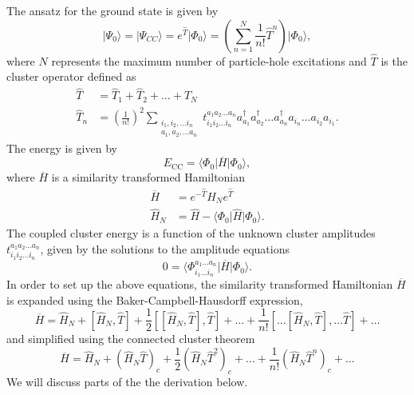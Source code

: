 \documentclass[%
oneside,                 %
final,                   %
10pt]{article}
\begin{document}
The ansatz for the ground state  is given by
  \begin{equation*}
     \vert \Psi_0\rangle = \vert \Psi_{CC}\rangle = e^{\hat{T}} \vert
     \Phi_0\rangle = \left( \sum_{n=1}^{N} \frac{1}{n!} \hat{T}^n
     \right) \vert \Phi_0\rangle,
  \end{equation*}
  where $N$ represents the maximum number of particle-hole excitations
  and $\hat{T}$ is the cluster operator defined as
  \begin{align*}
              \hat{T} &= \hat{T}_1 + \hat{T}_2 + \ldots + \hat{T}_N
              \\ \hat{T}_n &= \left(\frac{1}{n!}\right)^2
              \sum_{\substack{ i_1,i_2,\ldots i_n \\ a_1,a_2,\ldots
                  a_n}} t_{i_1i_2\ldots i_n}^{a_1a_2\ldots a_n}
              a_{a_1}^\dagger a_{a_2}^\dagger \ldots a_{a_n}^\dagger
              a_{i_n} \ldots a_{i_2} a_{i_1}.
          \end{align*}
      The energy is given by
      \begin{equation*}
          E_{\mathrm{CC}} = \langle\Phi_0\vert \overline{H}\vert
          \Phi_0\rangle,
      \end{equation*}
      where $\overline{H}$ is a similarity transformed Hamiltonian
      \begin{align*}
          \overline{H}&= e^{-\hat{T}} \hat{H}_N e^{\hat{T}}
          \\ \hat{H}_N &= \hat{H} - \langle\Phi_0\vert \hat{H} \vert
          \Phi_0\rangle.
      \end{align*}
      The coupled cluster energy is a function of the unknown cluster
      amplitudes $t_{i_1i_2\ldots i_n}^{a_1a_2\ldots a_n}$, given by
      the solutions to the amplitude equations
      \begin{equation}\label{eq:amplitudeeq}
          0 = \langle\Phi_{i_1 \ldots i_n}^{a_1 \ldots a_n}\vert
          \overline{H}\vert \Phi_0\rangle.
      \end{equation}
In order to set up the above equations,
the similarity transformed Hamiltonian $\overline{H}$ is expanded
  using the Baker-Campbell-Hausdorff expression,
      \begin{equation}\label{eq:bch}
          \overline{H}= \hat{H}_N + \left[ \hat{H}_N, \hat{T} \right]
          + \frac{1}{2} \left[\left[ \hat{H}_N, \hat{T} \right],
            \hat{T}\right] + \ldots + \frac{1}{n!} \left[
            \ldots \left[ \hat{H}_N, \hat{T} \right], \ldots \hat{T}
            \right] +\dots
      \end{equation}
  and simplified using the connected cluster theorem
      \begin{equation*}
          \overline{H}= \hat{H}_N + \left( \hat{H}_N \hat{T}\right)_c
          + \frac{1}{2} \left( \hat{H}_N \hat{T}^2\right)_c + \dots +
          \frac{1}{n!} \left( \hat{H}_N \hat{T}^n\right)_c +\dots
      \end{equation*}
We will discuss parts of the the derivation below.
\end{document}
